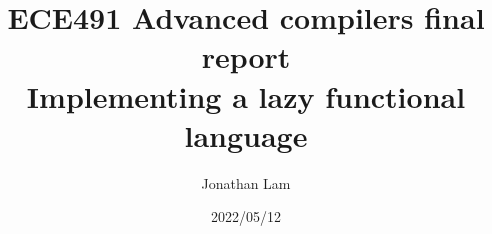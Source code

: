 \documentclass{article}
\title{
  ECE491 Advanced compilers final report \\
  Implementing a lazy functional language
}
\author{Jonathan Lam}
\date{2022/05/12}
\begin{document}
\maketitle{}

\tableofcontents{}









\end{document}
